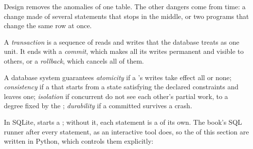 Design removes the anomalies of one table. The other dangers come from time: a change made of several statements that
stops in the middle, or two programs that change the same row at once.

\begin{definition}\label{def:b2:database-design:transaction}
A \emph{transaction} is a sequence of reads and writes that the database treats as one unit. It ends
with a \emph{commit}, which makes all its writes permanent and visible to others, or a
\emph{rollback}, which cancels all of them.
\end{definition}

\begin{definition}\label{def:b2:database-design:acid}
A database system guarantees \emph{atomicity} if a 's writes take effect all or none;
\emph{consistency} if a  that starts from a state satisfying the declared
constraints and  leaves one; \emph{isolation} if concurrent  do not see each other's
partial work, to a degree fixed by the ; \emph{durability} if a committed 
survives a crash.
\end{definition}

In SQLite,  starts a ; without it, each statement is a  of its own. The book's SQL
runner  after every statement, as an interactive tool does, so the  of this section are written in
Python, which controls them explicitly:

\label{lst:b2:database-design:rollback}

\label{out:b2:database-design:rollback}

